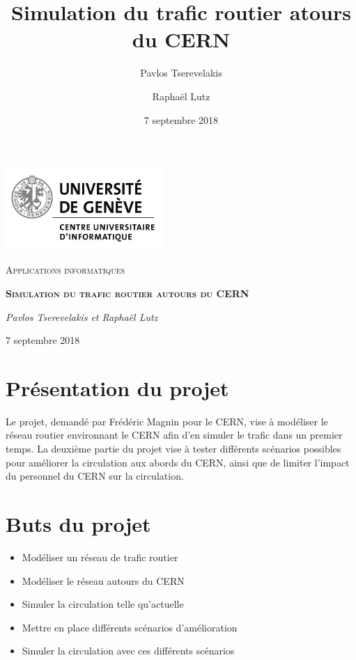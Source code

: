 \documentclass[a4paper,11pt, titlepage]{extarticle}
\title{Simulation du trafic routier atours du CERN}
\author{Pavlos Tserevelakis \and Raphaël Lutz}
\date{7 septembre 2018}
\begin{document}
\begin{titlepage}
	\centering
	\includegraphics[width=0.45\textwidth]{logoUni.jpg}\par
	\vspace{3cm}
	{\scshape\Large Applications informatiques \par}
	\vspace{1.5cm}
	{\scshape\huge\bfseries Simulation du trafic routier autours du CERN\par}
	\vspace{1.5cm}
	{\Large\itshape Pavlos Tserevelakis et Raphaël Lutz\par}
	\vspace{1.5cm}
	{ 7 septembre 2018\par}
	\vfill
\end{titlepage}


\pagestyle{fancy}
\renewcommand{\headheight}{24pt}
\rhead{\today}

\section{Présentation du projet}

Le projet, demandé par Frédéric Magnin pour le CERN, vise à modéliser le réseau routier environnant le CERN afin d'en simuler le trafic dans un premier temps. La deuxième partie du projet vise à tester différents scénarios possibles pour améliorer la circulation aux abords du CERN, ainsi que de limiter l'impact du personnel du CERN sur la circulation.

\section{Buts du projet}

\begin{itemize}
\item Modéliser un réseau de trafic routier
\item Modéliser le réseau autours du CERN
\item Simuler la circulation telle qu'actuelle
\item Mettre en place différents scénarios d'amélioration
\item Simuler la circulation avec ces différents scénarios
\end{itemize}
\end{document}
